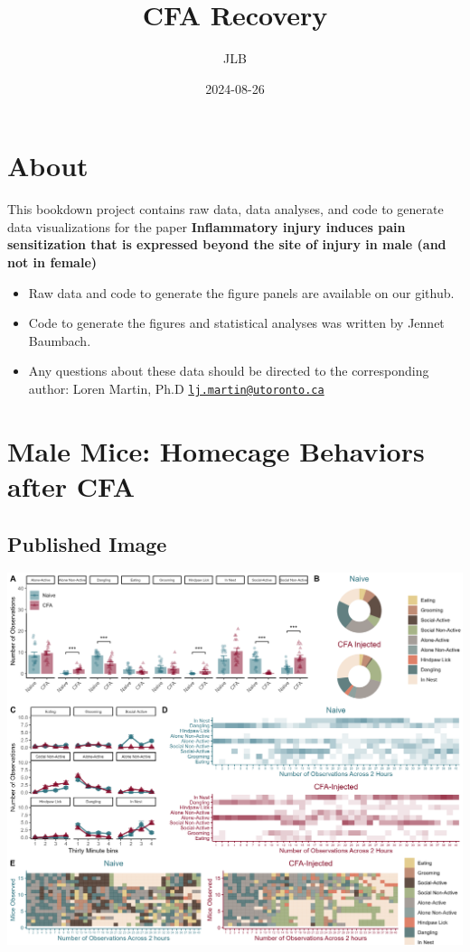 \documentclass[
]{book}
\title{CFA Recovery}
\author{JLB}
\date{2024-08-26}
\begin{document}
\maketitle

{
\setcounter{tocdepth}{1}
\tableofcontents
}
\hypertarget{about}{%
\chapter*{About}\label{about}}

This bookdown project contains raw data, data analyses, and code to generate data visualizations for the paper \textbf{Inflammatory injury induces pain sensitization that is expressed beyond the site of injury in male (and not in female)}

\begin{itemize}
\item
  Raw data and code to generate the figure panels are available on our github.
\item
  Code to generate the figures and statistical analyses was written by Jennet Baumbach.
\item
  Any questions about these data should be directed to the corresponding author: Loren Martin, Ph.D \href{mailto:lj.martin@utoronto.ca}{\nolinkurl{lj.martin@utoronto.ca}}
\end{itemize}

\hypertarget{male-mice-homecage-behaviors-after-cfa}{%
\chapter{Male Mice: Homecage Behaviors after CFA}\label{male-mice-homecage-behaviors-after-cfa}}

\hypertarget{published-image}{%
\section*{Published Image}\label{published-image}}

\includegraphics[width=45.83in]{Figs/1_male_HC_panel}
\end{document}
